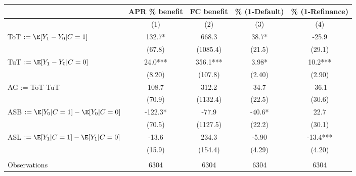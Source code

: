 \begin{tabular}{lcccc}
\toprule
      & APR \% benefit & FC benefit & \% (1-Default) & \% (1-Refinance) \\
\midrule
      & (1)   & (2)   & (3)   & (4) \\
\midrule
\midrule
ToT $:= \E[Y_1 - Y_0 | C=1]$ & 132.7* & 668.3 & 38.7* & -25.9 \\
      & (67.8) & (1085.4) & (21.5) & (29.1) \\
TuT $:= \E[Y_1 - Y_0 | C=0]$ & 24.0*** & 356.1*** & 3.98* & 10.2*** \\
      & (8.20) & (107.8) & (2.40) & (2.90) \\
\midrule
AG := ToT-TuT & 108.7 & 312.2 & 34.7  & -36.1 \\
      & (70.9) & (1132.4) & (22.5) & (30.6) \\
ASB $:= \E[Y_0 | C=1]-\E[Y_0 | C=0]$ & -122.3* & -77.9 & -40.6* & 22.7 \\
      & (70.5) & (1127.5) & (22.2) & (30.1) \\
ASL $:= \E[Y_1 | C=1]-\E[Y_1 | C=0]$ & -13.6 & 234.3 & -5.90 & -13.4*** \\
      & (15.9) & (154.4) & (4.29) & (4.20) \\
      &       &       &       &  \\
\midrule
Observations & 6304  & 6304  & 6304  & 6304 \\
\bottomrule
\bottomrule
\end{tabular}%
